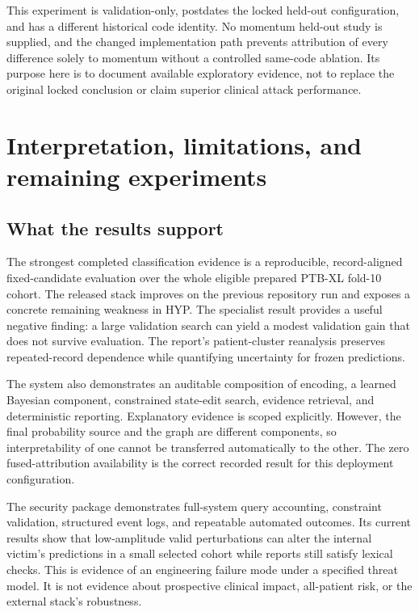 This experiment is validation-only, postdates the locked held-out configuration, and has a different historical code identity. No momentum held-out study is supplied, and the changed implementation path prevents attribution of every difference solely to momentum without a controlled same-code ablation. Its purpose here is to document available exploratory evidence, not to replace the original locked conclusion or claim superior clinical attack performance.



\section{Interpretation, limitations, and remaining experiments}
\label{sec:discussion}
\subsection{What the results support}
The strongest completed classification evidence is a reproducible, record-aligned fixed-candidate evaluation over the whole eligible prepared PTB-XL fold-10 cohort. The released stack improves on the previous repository run and exposes a concrete remaining weakness in HYP. The specialist result provides a useful negative finding: a large validation search can yield a modest validation gain that does not survive evaluation. The report's patient-cluster reanalysis preserves repeated-record dependence while quantifying uncertainty for frozen predictions.

The system also demonstrates an auditable composition of encoding, a learned Bayesian component, constrained state-edit search, evidence retrieval, and deterministic reporting. Explanatory evidence is scoped explicitly. However, the final probability source and the graph are different components, so interpretability of one cannot be transferred automatically to the other. The zero fused-attribution availability is the correct recorded result for this deployment configuration.

The security package demonstrates full-system query accounting, constraint validation, structured event logs, and repeatable automated outcomes. Its current results show that low-amplitude valid perturbations can alter the internal victim's predictions in a small selected cohort while reports still satisfy lexical checks. This is evidence of an engineering failure mode under a specified threat model. It is not evidence about prospective clinical impact, all-patient risk, or the external stack's robustness.

